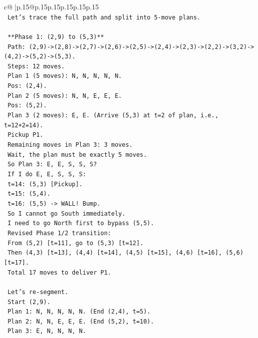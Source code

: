 \documentclass{article}
\begin{document}
{\begin{supertabular}{c@{$\;$}|p{.15\linewidth}@{}p{.15\linewidth}p{.15\linewidth}p{.15\linewidth}p{.15\linewidth}p{.15\linewidth}}
{{{\\ 
\texttt{   Let's trace the full path and split into 5{-}move plans.} \\
\\ 
\texttt{   **Phase 1: (2,9) to (5,3)**} \\
\texttt{   Path: (2,9){-}>(2,8){-}>(2,7){-}>(2,6){-}>(2,5){-}>(2,4){-}>(2,3){-}>(2,2){-}>(3,2){-}>(4,2){-}>(5,2){-}>(5,3).} \\
\texttt{   Steps: 12 moves.} \\
\texttt{   Plan 1 (5 moves): N, N, N, N, N.} \\
\texttt{   Pos: (2,4).} \\
\texttt{   Plan 2 (5 moves): N, N, E, E, E.} \\
\texttt{   Pos: (5,2).} \\
\texttt{   Plan 3 (2 moves): E, E. (Arrive (5,3) at t=2 of plan, i.e., t=12+2=14).} \\
\texttt{   Pickup P1.} \\
\texttt{   Remaining moves in Plan 3: 3 moves.} \\
\texttt{   Wait, the plan must be exactly 5 moves.} \\
\texttt{   So Plan 3: E, E, S, S, S?} \\
\texttt{   If I do E, E, S, S, S:} \\
\texttt{   t=14: (5,3) {[}Pickup{]}.} \\
\texttt{   t=15: (5,4).} \\
\texttt{   t=16: (5,5) {-}> WALL! Bump.} \\
\texttt{   So I cannot go South immediately.} \\
\texttt{   I need to go North first to bypass (5,5).} \\
\texttt{   Revised Phase 1/2 transition:} \\
\texttt{   From (5,2) {[}t=11{]}, go to (5,3) {[}t=12{]}.} \\
\texttt{   Then (4,3) {[}t=13{]}, (4,4) {[}t=14{]}, (4,5) {[}t=15{]}, (4,6) {[}t=16{]}, (5,6) {[}t=17{]}.} \\
\texttt{   Total 17 moves to deliver P1.} \\
\\ 
\texttt{   Let's re{-}segment.} \\
\texttt{   Start (2,9).} \\
\texttt{   Plan 1: N, N, N, N, N. (End (2,4), t=5).} \\
\texttt{   Plan 2: N, N, E, E, E. (End (5,2), t=10).} \\
\texttt{   Plan 3: E, N, N, N, N.} \\
}}}
\end{supertabular}}
\end{document}
